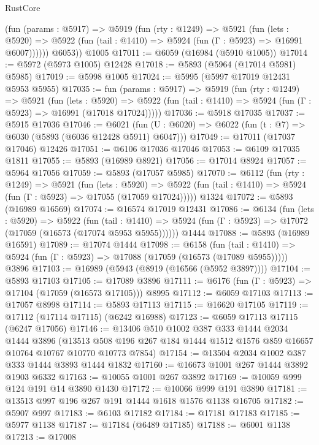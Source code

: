 \begin{lexlean}{RustCore}
\begin{coremodule}
          (fun (params : @5917) =>
          @5919
            (fun (rty : @1249) =>
            @5921
              (fun (lets : @5920) =>
              @5922 (fun (tail : @1410) => @5924 (fun (Γ : @5923) => @16991 @6007))))))
        @6053))
    @1005
@17011 := @6059 (@16984 (@5910 @1005))
@17014 := @5972 (@5973 @1005) @12428
@17018 := @5893 (@5964 (@17014 @5981) @5985)
@17019 := @5998 @1005
@17024 := @5995 (@5997 @17019 @12431 @5953 @5955)
@17035 := fun (params : @5917) =>
  @5919
    (fun (rty : @1249) =>
    @5921
      (fun (lets : @5920) =>
      @5922 (fun (tail : @1410) => @5924 (fun (Γ : @5923) => @16991 (@17018 @17024)))))
@17036 := @5918 @17035
@17037 := @5915 @17036
@17046 := @6021
    (fun (U : @6020) => @6022 (fun (t : @7) => @6030 (@5893 (@6036 @12428 @5911) @6047)))
@17049 := @17011 (@17037 @17046) @12426
@17051 := @6106 @17036 @17046
@17053 := @6109 @17035 @1811
@17055 := @5893 (@16989 @8921)
@17056 := @17014 @8924
@17057 := @5964 @17056
@17059 := @5893 (@17057 @5985)
@17070 := @6112
    (fun (rty : @1249) =>
    @5921
      (fun (lets : @5920) =>
      @5922 (fun (tail : @1410) => @5924 (fun (Γ : @5923) => @17055 (@17059 @17024)))))
    @1324
@17072 := @5893 (@16989 @16569)
@17074 := @16574 @17019 @12431
@17086 := @6134
    (fun (lets : @5920) =>
    @5922
      (fun (tail : @1410) =>
      @5924 (fun (Γ : @5923) => @17072 (@17059 (@16573 (@17074 @5953 @5955))))))
    @1444
@17088 := @5893 (@16989 @16591)
@17089 := @17074 @1444
@17098 := @6158
    (fun (tail : @1410) => @5924 (fun (Γ : @5923) => @17088 (@17059 (@16573 (@17089 @5955)))))
    @3896
@17103 := @16989 (@5943 (@8919 (@16566 (@5952 @3897))))
@17104 := @5893 @17103
@17105 := @17089 @3896
@17111 := @6176 (fun (Γ : @5923) => @17104 (@17059 (@16573 @17105))) @8995
@17112 := @6059 @17103
@17113 := @17057 @8998
@17114 := @5893 @17113
@17115 := @16620 @17105
@17119 := @17112 (@17114 @17115) (@6242 @16988)
@17123 := @6059 @17113 @17115 (@6247 @17056)
@17146 := @13406
    @510
    @1002
    @387
    @333
    @1444
    @2034
    @1444
    @3896
    (@13513 @508 @196 @267 @184 @1444 @1512 @1576 @859 @16657 @10764 @10767 @10770 @10773 @7854)
@17154 := @13504 @2034 @1002 @387 @333 @1444 @3893 @1444 @1832
@17160 := @16673 @1001 @267 @1444 @3892 @1903 @6332
@17163 := @10055 @1001 @267 @3892
@17169 := @10059 @999 @124 @191 @14 @3890 @1430
@17172 := @10066 @999 @191 @3890
@17181 := @13513 @997 @196 @267 @191 @1444 @1618 @1576 @1138 @16705
@17182 := @5907 @997
@17183 := @6103 @17182
@17184 := @17181 @17183
@17185 := @5977 @1138
@17187 := @17184 (@6489 @17185)
@17188 := @6001 @1138
@17213 := @17008

\end{coremodule}
\end{lexlean}
